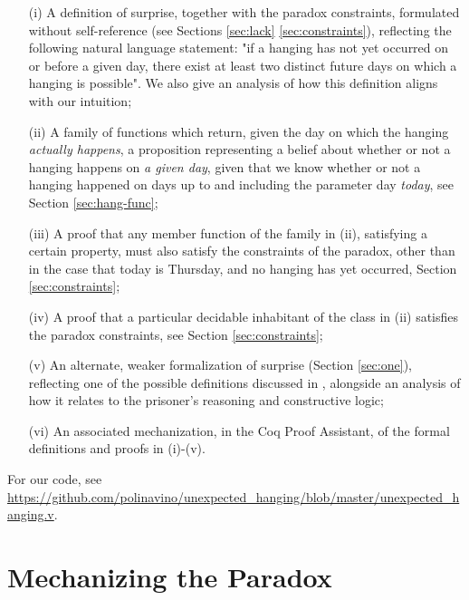 \documentclass[runningheads]{llncs}
\begin{document}
  \begin{itemize}
    \item[(i)] A definition of surprise, together with the paradox
    constraints, formulated without self-reference (see
    Sections \ref{sec:lack} \ref{sec:constraints}), reflecting
    the following natural language statement: "if a hanging has not yet occurred on or before a given day,
    there exist at least two distinct future days on which a hanging
    is possible". We
    also give an analysis of how this definition aligns with our intuition;

    \item[(ii)] A family of functions which return, given the day on which the hanging
    \emph{actually happens}, a proposition representing a belief about
    whether or not a hanging happens on \emph{a given day}, given that we know whether or not a hanging
    happened on days up to and including the parameter day \emph{today}, see Section \ref{sec:hang-func};

    \item[(iii)] A proof that any member function of the family in (ii), satisfying
    a certain property, must also satisfy the constraints of the paradox,
    other than in the case that today is Thursday, and no hanging has yet occurred,
    Section \ref{sec:constraints};

    \item[(iv)] A proof that a particular decidable inhabitant of the class in (ii)
    satisfies the paradox constraints, see Section \ref{sec:constraints};

    \item[(v)] An alternate, weaker formalization of surprise (Section \ref{sec:one}),
    reflecting one of the possible definitions discussed in \cite{fourpossible},
    alongside an analysis of how it relates to the prisoner's reasoning and
    constructive logic;

    \item[(vi)] An associated mechanization, in the Coq Proof Assistant, of the formal
    definitions and proofs in (i)-(v).
  \end{itemize}

  For our code, see \url{https://github.com/polinavino/unexpected_hanging/blob/master/unexpected_hanging.v}.

\section{Mechanizing the Paradox}
\label{sec:form}
\end{document}
